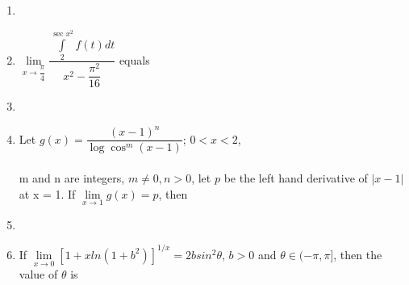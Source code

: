\documentclass[journal,12pt,twocolumn]{IEEEtran}
\begin{document}
\begin{enumerate}
\item[~] \item $\lim\limits_{x \to \dfrac{\pi}{4}}\dfrac{\int\limits_2^{\sec x^2}f(t) dt}{x^2-\dfrac{\pi ^2}{16}}$ equals \\ 
\begin{itemize}
\end{itemize}

\item[~] \item Let $g(x)=\dfrac{(x-1)^n}{\log\cos^m(x-1)}$; $0<x<2$, \\ \\m and n are integers, $m \ne 0, n>0$, let $p$ be the left hand derivative of $|x-1|$ at x = 1. If $\lim\limits_{x \to 1}g(x)=p$, then
\begin{itemize}
\end{itemize} 

\item[~] \item If $\lim\limits_{x \to 0}\left[1+xln(1+b^2)\right]^{1/x}=2bsin^2\theta$, $b>0$ and $\theta \in (-\pi, \pi]$, then the value of $\theta$ is
\begin{itemize}
\end{itemize}


\end{enumerate}
\end{document}
